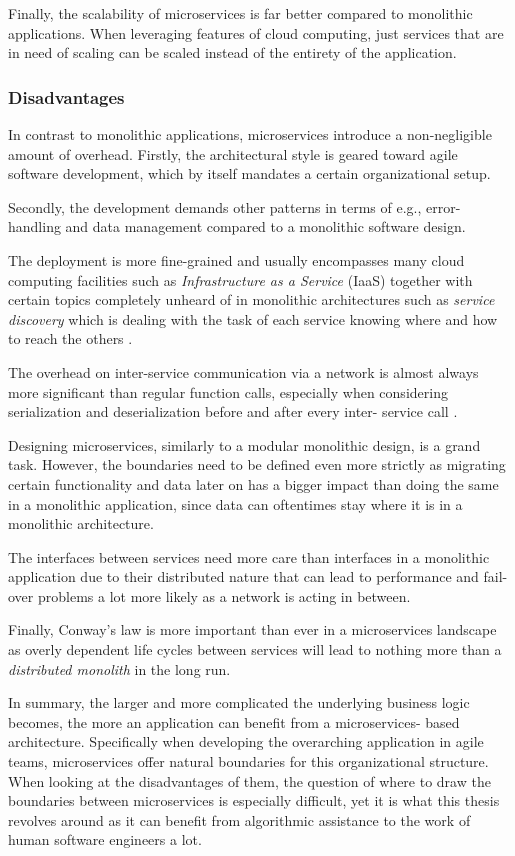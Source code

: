 \documentclass[12pt,a4paper]{report}
\begin{document}
Finally, the scalability of microservices is far better compared to monolithic
applications. When leveraging features of cloud computing, just services that
are in need of scaling can be scaled instead of the entirety of the
application.


\subsubsection{Disadvantages}
In contrast to monolithic applications,
microservices introduce a non\hyp negligible amount of overhead. Firstly, the
architectural style is geared toward agile software development, which by itself
mandates a certain organizational setup.

Secondly, the development demands other patterns in terms of e.g., error\hyp
handling and data management compared to a monolithic software design.

The deployment is more fine-grained and usually encompasses many
cloud computing facilities such as \textit{Infrastructure as a Service} (IaaS)
together with certain topics completely unheard of in monolithic architectures
such as \textit{service discovery} which is dealing with the task of each
service knowing where and how to reach the others \cite{newman2015building}.

The overhead on inter-service communication via a network is almost
always more significant than regular function calls, especially when
considering serialization and deserialization before and after every inter\hyp
service call \cite{knoche2016sustaining, newman2015building}.

Designing microservices, similarly to a modular monolithic
design, is a grand task. However, the boundaries need to be defined even more
strictly as migrating certain functionality and data later on has a bigger
impact than doing the same in a monolithic application, since data can
oftentimes stay where it is in a monolithic architecture.

The interfaces between services need more care than interfaces in a
monolithic application due to their distributed nature that can lead to
performance and fail-over problems a lot more likely as a network is acting in
between.

Finally, Conway's law \cite{conway1968law} is more important than ever in a
microservices landscape as overly dependent life cycles between services will
lead to nothing more than a \textit{distributed monolith} in the long run.

In summary, the larger and more complicated the underlying business
logic becomes, the more an application can benefit from a microservices\hyp
based architecture. Specifically when developing the overarching application in
agile teams, microservices offer natural boundaries for this organizational
structure. When looking at the disadvantages of them, the question
of where to draw the boundaries between microservices is especially difficult,
yet it is what this thesis revolves around as it can benefit from algorithmic
assistance to the work of human software engineers a lot.
\end{document}

